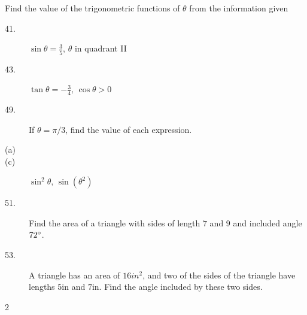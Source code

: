 Find the value of the trigonometric functions of $\theta $ from the information given 


\begin{description}
\item [41.] $\sin  \theta  =\frac{3}{5}\text{,}$ $\theta $ in quadrant II 

\item [43.]
$\tan  \theta  = -\frac{3}{4}\text{,}$ $\cos  \theta  >0$ 

\item [49.] If $\theta  =\pi /3\text{,}$ find the value of each expression. 

\item [(a)]
\columnsep =30pt
 

\item [(c)]
$\sin ^{2} \theta \text{,}$ $\sin  \left (\theta ^{2}\right )$ 

\item [51.] Find the area of a triangle
with sides of length $7$ and $9$ and included angle $72 \mbox{{\ensuremath{{}^\circ}}}$. 

\item [53.]
A triangle has an area of $16 in^{2}\text{,}$ and two of the sides of the triangle have lengths $5 \mbox{in}$ and $7 \mbox{in}$. Find the angle included by these two sides. \end{description}


\columnsep =30pt
\begin {multicols}{2}
 


\end {multicols}
 

